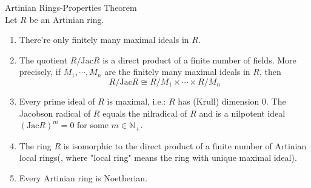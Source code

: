 \begin{theorem}{Artinian Rings-Properties Theorem}\\
Let $R$ be an Artinian ring.
\begin{enumerate}
    \item There're only finitely many maximal ideals in $R$.
    \item The quotient $R/ \text{Jac}R$ is a direct product of a finite number of fields. More precisely, if $M_1 ,\cdots, M_n$ are the finitely many maximal ideals in $R$, then
    $$R/ \text{Jac}R \cong R/M_1 \times \cdots \times R/M_n$$
    \item Every prime ideal of $R$ is maximal, i.e.: $R$ has (Krull) dimension $0$. The Jacobson radical of $R$ equals the nilradical of $R$ and is a nilpotent ideal $(\text{Jac}R)^m =0$ for some $m \in \mathbb{N}_+$.

    \item The ring $R$ is isomorphic to the direct product of a finite number of Artinian local rings(, where "local ring" means the ring with unique maximal ideal).

    \item Every Artinian ring is Noetherian.
\end{enumerate}
\end{theorem}

